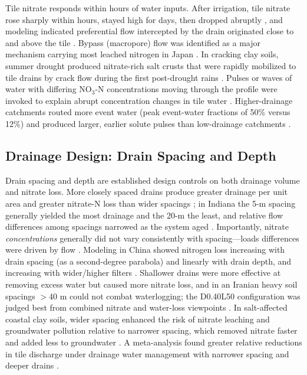 Tile nitrate responds within hours of water inputs. After irrigation, tile nitrate rose sharply within hours, stayed high for days, then dropped abruptly \parencite{Mohanty1998}, and modeling indicated preferential flow intercepted by the drain originated close to and above the tile \parencite{Mohanty1998}. Bypass (macropore) flow was identified as a major mechanism carrying most leached nitrogen in Japan \parencite{Hayashi1999}. In cracking clay soils, summer drought produced nitrate-rich salt crusts that were rapidly mobilized to tile drains by crack flow during the first post-drought rains \parencite{Colombani2016}. Pulses or waves of water with differing NO$_3$-N concentrations moving through the profile were invoked to explain abrupt concentration changes in tile water \parencite{BAKER1975}. Higher-drainage catchments routed more event water (peak event-water fractions of 50\% versus 12\%) and produced larger, earlier solute pulses than low-drainage catchments \parencite{Kennedy2012}.

\subsection{Drainage Design: Drain Spacing and Depth}

Drain spacing and depth are established design controls on both drainage volume and nitrate loss. More closely spaced drains produce greater drainage per unit area and greater nitrate-N loss than wider spacings \parencite{Kladivko2021,Kladivko2004}; in Indiana the 5-m spacing generally yielded the most drainage and the 20-m the least, and relative flow differences among spacings narrowed as the system aged \parencite{Kladivko2004,Kladivko2021}. Importantly, nitrate \emph{concentrations} generally did not vary consistently with spacing---loads differences were driven by flow \parencite{Kladivko2021,Kladivko2004}. Modeling in China showed nitrogen loss increasing with drain spacing (as a second-degree parabola) and linearly with drain depth, and increasing with wider/higher filters \parencite{Tao2021}. Shallower drains were more effective at removing excess water but caused more nitrate loss, and in an Iranian heavy soil spacings $>$40 m could not combat waterlogging; the D0.40L50 configuration was judged best from combined nitrate and water-loss viewpoints \parencite{Hashemi2020}. In salt-affected coastal clay soils, wider spacing enhanced the risk of nitrate leaching and groundwater pollution relative to narrower spacing, which removed nitrate faster and added less to groundwater \parencite{Singh2002,Singh2007,Singh2001c}. A meta-analysis found greater relative reductions in tile discharge under drainage water management with narrower spacing and deeper drains \parencite{Ross2016}.


